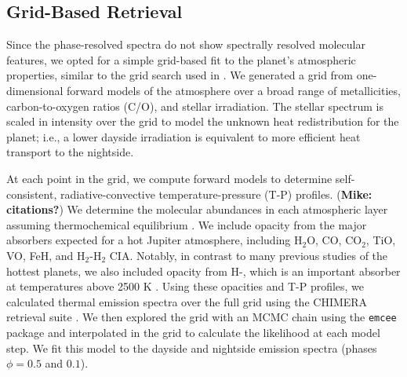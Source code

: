 \documentclass[twocolumn]{aastex61}
\begin{document}
\subsection{Grid-Based Retrieval}
Since the phase-resolved spectra do not show spectrally resolved molecular features, we opted for a simple grid-based fit to the planet's atmospheric properties, similar to the grid search used in \cite{arcangeli18, mansfield18}. We generated a grid from one-dimensional forward models of the atmosphere over a broad range of metallicities, carbon-to-oxygen ratios (C/O), and stellar irradiation. The stellar spectrum is scaled in intensity over the grid to model the unknown heat redistribution for the planet; i.e., a lower dayside irradiation is equivalent to more efficient heat transport to the nightside. 

At each point in the grid, we compute forward models to determine self-consistent, radiative-convective temperature-pressure (T-P) profiles. (\textbf{Mike: citations?}) We determine the molecular abundances in each atmospheric layer assuming thermochemical equilibrium \citep[calculated with the NASA CEA routine;][]{gordon94}.  We include opacity from the major absorbers expected for a hot Jupiter atmosphere, including H$_2$O, CO, CO$_2$, TiO, VO, FeH, and H$_2$-H$_2$ CIA. Notably, in contrast to many previous studies of the hottest planets, we also included opacity from H-, which is an important absorber at temperatures above 2500 K \citep{arcangeli18}.  Using these opacities and T-P profiles, we calculated thermal emission spectra over the full grid using the CHIMERA retrieval suite \citep[described in][]{line13a, line14}.  We then explored the grid with an MCMC chain using the \texttt{emcee} package \citep{foremanmackey13} and interpolated in the grid to calculate the likelihood at each model step. We fit this model to the dayside and nightside emission spectra (phases $\phi = 0.5$ and $0.1$). 
\end{document}
